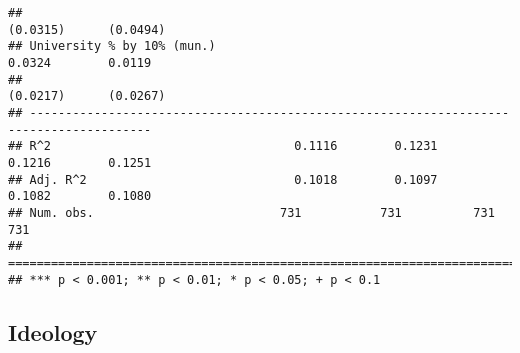 \documentclass[
]{article}
\begin{document}
\begin{verbatim}
##                                                                (0.0315)      (0.0494)  
## University % by 10% (mun.)                                      0.0324        0.0119   
##                                                                (0.0217)      (0.0267)  
## ---------------------------------------------------------------------------------------
## R^2                                  0.1116        0.1231       0.1216        0.1251   
## Adj. R^2                             0.1018        0.1097       0.1082        0.1080   
## Num. obs.                          731           731          731           731        
## =======================================================================================
## *** p < 0.001; ** p < 0.01; * p < 0.05; + p < 0.1
\end{verbatim}

\hypertarget{ideology-1}{%
\subsection{Ideology}\label{ideology-1}}
\end{document}
